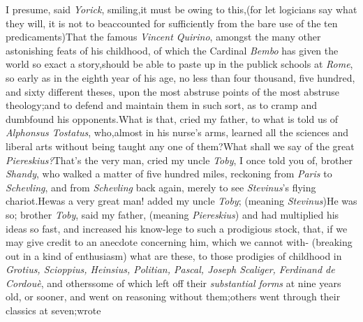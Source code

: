 \documentclass{article}
\begin{document}
I presume, said \textit{Yorick}, smiling,\tsk it must be owing to
this,\tsk (for let logi\-cians say what they will,
it is not to be\break accounted
for sufficiently from the bare use of the ten predicaments)\tsh That
the famous \textit{Vincent Quirino}, amongst the many other astonishing feats of
his childhood, of which the Cardinal \textit{Bembo} has given the world so exact
a story,\tsk should be able to paste up in the publick schools
at \textit{Rome}, so early as in the eighth year of his age, no less than four
thousand, five hundred, and sixty different theses, upon the most abstruse points of
the most abstruse theology;\tsk and to defend and maintain them in such sort, as to
cramp and dumbfound his opponents.\tsh\break What is that, cried my father, to what
is told us of \textit{Alphonsus Tostatus},
who,\break almost in his nurse’s arms, learned
all the sciences and liberal arts without being taught any one of them?\tsh What
shall we say of the great \textit{Piereskius?}\tsk\break That’s the very man, cried
my uncle \textit{Toby}, I once told you of, brother \textit{Shandy}, who walked a
matter of five hundred miles, reckoning from \textit{Paris} to \textit{Schevling},
and from \textit{Schevling} back again, merely to see \textit{Stevinus}’s flying
chariot.\tsh He\break was a very great man! added my uncle \textit{Toby}; (meaning
\textit{Stevinus})\tsk He was so;
brother \textit{Toby}, said my father, (meaning
\textit{Piereskius})\tsk\enlargethispage\baselineskip
and had multiplied his ideas so fast, and increased his
know-\break lege to such a prodigious stock, that, if we may give credit to an anecdote
concerning him, which we cannot with-\break{}
(breaking out in a kind of enthusiasm)\break
\tsk what are
these, to those prodigies of childhood in \textit{Grotius, Scioppius, Heinsius,
Politian, Pascal, Joseph Scaliger, Ferdinand de Cordouè}, and others\tsk some of
which left off their \textit{substantial forms} at
nine years old, or sooner, and went on reasoning without them;\tsk others went
through their classics at seven;\tsk wrote \break
\end{document}
